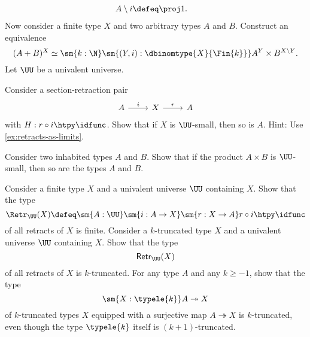 \begin{exercises}
\begin{align*}
    A\setminus i & \defeq \proj 1.
  \end{align*}
  Now consider a finite type $X$ and two arbitrary types $A$ and $B$. Construct an equivalence
  \begin{equation*}
    (A+B)^X\simeq\sm{k:\N}\sm{(Y,i):\dbinomtype{X}{\Fin{k}}}A^Y\times B^{X\setminus Y}.
  \end{equation*}
  \exitem Let $\UU$ be a univalent universe.
  \begin{subexenum}
  \item Consider a section-retraction pair
    \begin{equation*}
      \begin{tikzcd}
        A \arrow[r,"i"] & X \arrow[r,"r"] & A
      \end{tikzcd}
    \end{equation*}
    with $H:r\circ i\htpy \idfunc$. Show that if $X$ is $\UU$-small, then so is $A$. Hint: Use \cref{ex:retracts-as-limits}.
  \item Consider two inhabited types $A$ and $B$. Show that if the product $A\times B$ is $\UU$-small, then so are the types $A$ and $B$.
  \end{subexenum}
  \exitem Consider a finite type $X$ and a univalent universe $\UU$ containing $X$. Show that the type
  \begin{equation*}
    \Retr_\UU(X)\defeq \sm{A:\UU}\sm{i:A\to X}\sm{r:X\to A}r\circ i\htpy\idfunc
  \end{equation*}
  of all retracts of $X$ is finite.
  \exitem Consider a $k$-truncated type $X$ and a univalent universe $\UU$ containing $X$. Show that the type
  \begin{equation*}
    \mathsf{Retr}_\UU(X)
  \end{equation*}
  of all retracts of $X$ is $k$-truncated.
  \exitem \label{ex:surjection-into-k-type}For any type $A$ and any $k\geq-1$, show that the type
  \begin{equation*}
    \sm{X:\typele{k}}A\twoheadrightarrow X
  \end{equation*}
  of $k$-truncated types $X$ equipped with a surjective map $A\twoheadrightarrow X$ is $k$-truncated, even though the type $\typele{k}$ itself is $(k+1)$-truncated.

\end{exercises}
